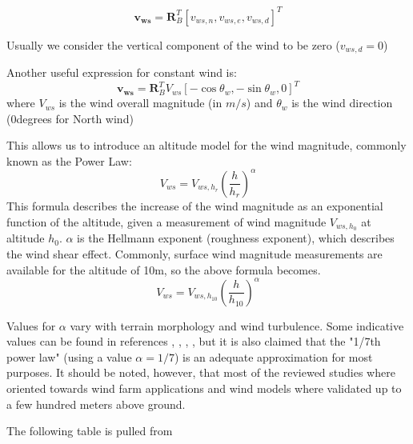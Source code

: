 \begin{equation}
\bm{v_{ws}} = \bm{R}_B^T[v_{ws,n}, v_{ws,e}, v_{ws,d}]^T
\end{equation}

Usually we consider the vertical component of the wind to be zero ($v_{ws,d}=0$)

Another useful expression for constant wind is:
\begin{equation}
\bm{v_{ws}} = \bm{R}_B^TV_{ws}[-\cos\theta_w, -\sin\theta_w, 0]^T
\end{equation}
where $V_{ws}$ is the wind overall magnitude (in $m/s$) and $\theta_w$ is the wind direction (0degrees for North wind)

This allows us to introduce an altitude model for the wind magnitude, commonly known as the Power Law:
\begin{equation}
V_{ws} = V_{ws,h_r} \left(\frac{h}{h_r}\right)^\alpha
\end{equation}
This formula describes the increase of the wind magnitude as an exponential function of the altitude, given a measurement of wind magnitude $V_{ws,h_0}$ at altitude $h_0$. $\alpha$ is the Hellmann exponent (roughness exponent), which describes the wind shear effect. Commonly, surface wind magnitude measurements are available for the altitude of 10m, so the above formula becomes.
\begin{equation} \label{eq:staticWind10}
V_{ws} = V_{ws,h_{10}} \left(\frac{h}{h_{10}}\right)^\alpha
\end{equation}

Values for $\alpha$ vary with terrain morphology and wind turbulence. Some indicative values can be found in references \cite{Banuelos-Ruedas2011}, \cite{Peterson1978}, \cite{wiki:WindGrad}, \cite{wiki:Wind_profile_power_law}, but it is also claimed that the "1/7th power law" (using a value $\alpha=1/7$) is an adequate approximation for most purposes.
It should be noted, however, that most of the reviewed studies where oriented towards wind farm applications and wind models where validated up to a few hundred meters above ground.

The following table is pulled from \cite{Banuelos-Ruedas2011}

